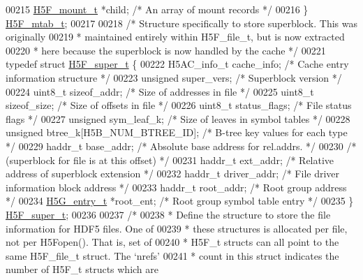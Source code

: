 \begin{DoxyCode}
00215     \hyperlink{struct_h5_f__mount__t}{H5F\_mount\_t}      *child; \textcolor{comment}{/* An array of mount records        */}
00216 \} \hyperlink{struct_h5_f__mtab__t}{H5F\_mtab\_t};
00217 
00218 \textcolor{comment}{/* Structure specifically to store superblock. This was originally}
00219 \textcolor{comment}{ * maintained entirely within H5F\_file\_t, but is now extracted}
00220 \textcolor{comment}{ * here because the superblock is now handled by the cache */}
00221 \textcolor{keyword}{typedef} \textcolor{keyword}{struct }\hyperlink{struct_h5_f__super__t}{H5F\_super\_t} \{
00222     H5AC\_info\_t cache\_info;     \textcolor{comment}{/* Cache entry information structure          */}
00223     \textcolor{keywordtype}{unsigned}    super\_vers;     \textcolor{comment}{/* Superblock version                         */}
00224     uint8\_t sizeof\_addr;    \textcolor{comment}{/* Size of addresses in file                  */}
00225     uint8\_t sizeof\_size;    \textcolor{comment}{/* Size of offsets in file                    */}
00226     uint8\_t     status\_flags;   \textcolor{comment}{/* File status flags                          */}
00227     \textcolor{keywordtype}{unsigned}    sym\_leaf\_k;     \textcolor{comment}{/* Size of leaves in symbol tables            */}
00228     \textcolor{keywordtype}{unsigned}    btree\_k[H5B\_NUM\_BTREE\_ID]; \textcolor{comment}{/* B-tree key values for each type */}
00229     haddr\_t     base\_addr;      \textcolor{comment}{/* Absolute base address for rel.addrs.       */}
00230                                 \textcolor{comment}{/* (superblock for file is at this offset)    */}
00231     haddr\_t     ext\_addr;       \textcolor{comment}{/* Relative address of superblock extension   */}
00232     haddr\_t     driver\_addr;    \textcolor{comment}{/* File driver information block address      */}
00233     haddr\_t     root\_addr;      \textcolor{comment}{/* Root group address                         */}
00234     \hyperlink{struct_h5_g__entry__t}{H5G\_entry\_t} *root\_ent;      \textcolor{comment}{/* Root group symbol table entry              */}
00235 \} \hyperlink{struct_h5_f__super__t}{H5F\_super\_t};
00236 
00237 \textcolor{comment}{/*}
00238 \textcolor{comment}{ * Define the structure to store the file information for HDF5 files. One of}
00239 \textcolor{comment}{ * these structures is allocated per file, not per H5Fopen(). That is, set of}
00240 \textcolor{comment}{ * H5F\_t structs can all point to the same H5F\_file\_t struct. The `nrefs'}
00241 \textcolor{comment}{ * count in this struct indicates the number of H5F\_t structs which are}

\end{DoxyCode}
